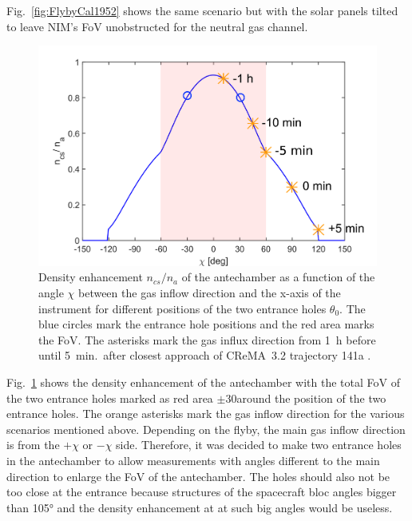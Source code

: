 Fig.~\ref{fig:FlybyCal1952} shows the same scenario but with the solar panels tilted to leave NIM's FoV unobstructed for the neutral gas channel. 
	\\
	\begin{figure}[h!]
		\centering
		\includegraphics[width=.8\textwidth]{Bilder/Chi_theta0_flyby.png}
		\caption{Density enhancement $n_{cs}/n_a$ of the antechamber as a function of the angle $\chi$ between the gas inflow direction and the x-axis of the instrument for different positions of the two entrance holes $\theta_0$. The blue circles mark the entrance hole positions and the red area marks the FoV. The asterisks mark the gas influx direction from 1~h before until 5~min.\ after closest approach of CReMA~3.2 trajectory 141a \cite{SOC_Crema3p2}.}
		\label{fig:densEnhChiFlyby}
	\end{figure}
	Fig.~\ref{fig:densEnhChiFlyby} shows the density enhancement of the antechamber with the total FoV of the two entrance holes marked as red area $\pm$30\degree around the position of the two entrance holes. The orange asterisks mark the gas inflow direction for the various scenarios mentioned above. Depending on the flyby, the main gas inflow direction is from the $+\chi$ or $-\chi$ side. Therefore, it was decided to make two entrance holes in the antechamber to allow measurements with angles different to the main direction to enlarge the FoV of the antechamber. The holes should also not be too close at the entrance because structures of the spacecraft bloc angles bigger than 105° and the density enhancement at at such big angles would be useless.\\
